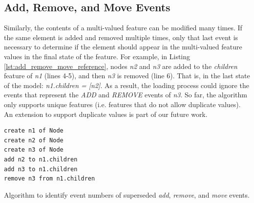 \documentclass{llncs}
\begin{document}
\subsection{Add, Remove, and Move Events}\label{subsec:add_remove_and_move_operations}
Similarly, the contents of a multi-valued feature can be modified many times.
If the same element is added and removed multiple times,  only that last event is necessary to determine if the element should appear in the multi-valued feature values in the final state of the feature.
For example, in Listing \ref{lst:add_remove_move_reference},  nodes \emph{n2} and \emph{n3} are added to the \emph{children} feature of \emph{n1} (lines 4-5), and then \emph{n3} is removed (line 6).
That is, in the last state of the model: \emph{n1.children = [n2]}.
As a result, the loading process could ignore the events that represent the \emph{ADD} and \emph{REMOVE} events of \emph{n3}. So far, the algorithm only supports unique features (i.e. features that do not allow duplicate values). An extension to support duplicate values is part of our future work. 

\begin{lstlisting}[style=eol,caption={Example of CBP representation of attribute \emph{values}'s add and remove operations.},label=lst:add_remove_move_reference]
create n1 of Node
create n2 of Node
create n3 of Node
add n2 to n1.children
add n3 to n1.children
remove n3 from n1.children
\end{lstlisting}

\begin{algorithm}[H]
\begin{small}
\end{small}
\caption{Algorithm to identify event numbers of superseded \emph{add}, \emph{remove}, and \emph{move} events.}
\label{alg:add_remove_move_optimisation}
\end{algorithm}
\end{document}
